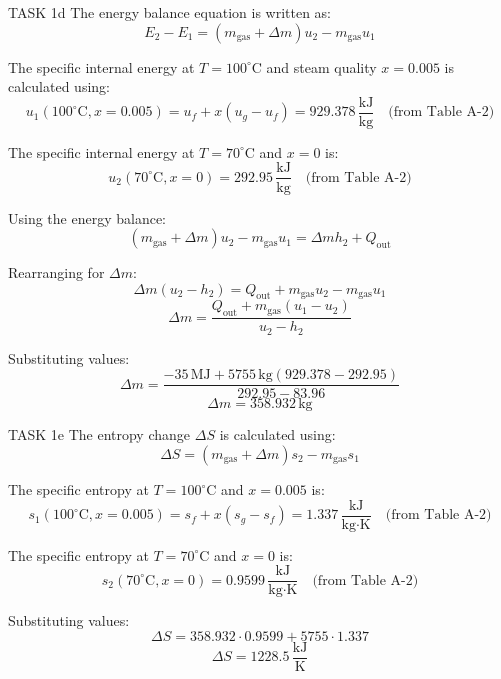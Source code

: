 TASK 1d  
The energy balance equation is written as:  
\[
E_2 - E_1 = (m_{\text{gas}} + \Delta m) u_2 - m_{\text{gas}} u_1
\]  

The specific internal energy at \( T = 100^\circ\text{C} \) and steam quality \( x = 0.005 \) is calculated using:  
\[
u_1(100^\circ\text{C}, x = 0.005) = u_f + x(u_g - u_f) = 929.378 \, \frac{\text{kJ}}{\text{kg}} \quad \text{(from Table A-2)}
\]  

The specific internal energy at \( T = 70^\circ\text{C} \) and \( x = 0 \) is:  
\[
u_2(70^\circ\text{C}, x = 0) = 292.95 \, \frac{\text{kJ}}{\text{kg}} \quad \text{(from Table A-2)}
\]  

Using the energy balance:  
\[
(m_{\text{gas}} + \Delta m) u_2 - m_{\text{gas}} u_1 = \Delta m h_2 + Q_{\text{out}}
\]  

Rearranging for \( \Delta m \):  
\[
\Delta m (u_2 - h_2) = Q_{\text{out}} + m_{\text{gas}} u_2 - m_{\text{gas}} u_1
\]  
\[
\Delta m = \frac{Q_{\text{out}} + m_{\text{gas}} (u_1 - u_2)}{u_2 - h_2}
\]  

Substituting values:  
\[
\Delta m = \frac{-35 \, \text{MJ} + 5755 \, \text{kg} (929.378 - 292.95)}{292.95 - 83.96}
\]  
\[
\Delta m = 358.932 \, \text{kg}
\]  

TASK 1e  
The entropy change \( \Delta S \) is calculated using:  
\[
\Delta S = (m_{\text{gas}} + \Delta m) s_2 - m_{\text{gas}} s_1
\]  

The specific entropy at \( T = 100^\circ\text{C} \) and \( x = 0.005 \) is:  
\[
s_1(100^\circ\text{C}, x = 0.005) = s_f + x(s_g - s_f) = 1.337 \, \frac{\text{kJ}}{\text{kg·K}} \quad \text{(from Table A-2)}
\]  

The specific entropy at \( T = 70^\circ\text{C} \) and \( x = 0 \) is:  
\[
s_2(70^\circ\text{C}, x = 0) = 0.9599 \, \frac{\text{kJ}}{\text{kg·K}} \quad \text{(from Table A-2)}
\]  

Substituting values:  
\[
\Delta S = 358.932 \cdot 0.9599 + 5755 \cdot 1.337
\]  
\[
\Delta S = 1228.5 \, \frac{\text{kJ}}{\text{K}}
\]